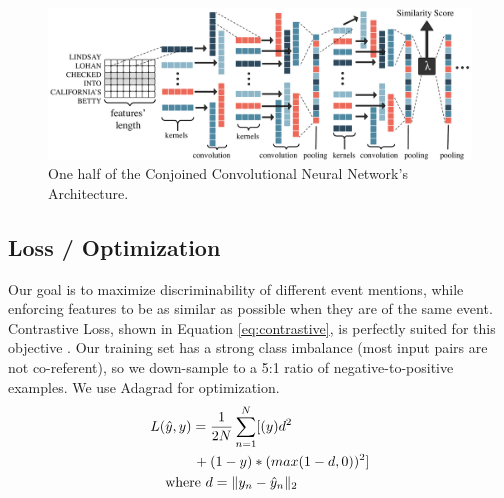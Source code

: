 \documentclass[11pt,a4paper]{article}
\begin{document}
\begin{figure}[h]
\centering
	\includegraphics[width=1\textwidth]{architecture.pdf}
	\caption{One half of the Conjoined Convolutional Neural Network's Architecture.}
	\label{fig:ccnn}
\end{figure}

\subsection{Loss / Optimization}
Our goal is to maximize discriminability of different event mentions, while enforcing features to be as similar as possible when they are of the same event.  Contrastive Loss, shown in Equation \ref{eq:contrastive}, is perfectly suited for this objective \cite{SchroffKP15,pmlr-v48-liud16}. Our training set has a strong class imbalance (most input pairs are not co-referent), so we down-sample to a 5:1 ratio of negative-to-positive examples.  We use Adagrad for optimization.
\begin{equation}
\begin{aligned}
L(&\hat{y},y)=\frac{1}{2N}\sum_{n=1}^{N}[(y)d^2 \\
&\qquad {} + (1-y)*(max(1-d,0))^2] \\
&\textnormal{where }d=\|y_{n}-\hat{y}_{n}\|_{2}
\end{aligned}
\label{eq:contrastive}
\end{equation}

\end{document}

